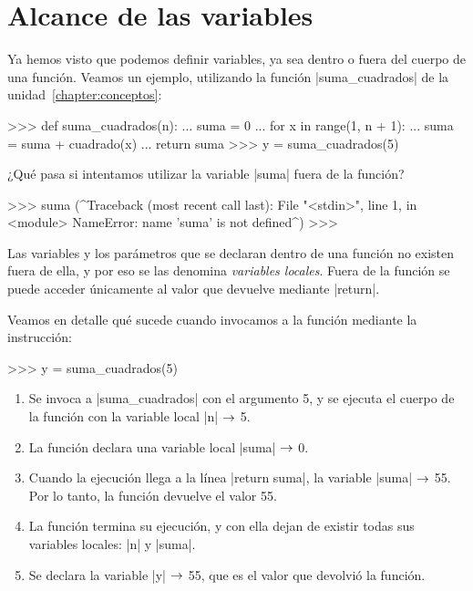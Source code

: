 \section{Alcance de las variables}

Ya hemos visto que podemos definir variables, ya sea dentro o fuera del cuerpo
de una función. Veamos un ejemplo, utilizando la función |suma_cuadrados| de la
unidad~\ref{chapter:conceptos}:

\begin{codigo-python-sn}
>>> def suma_cuadrados(n):
...     suma = 0
...     for x in range(1, n + 1):
...         suma = suma + cuadrado(x)
...     return suma
>>> y = suma_cuadrados(5)
\end{codigo-python-sn}

¿Qué pasa si intentamos utilizar la variable |suma| fuera de la función?

\begin{codigo-python-sn}
>>> suma
(^Traceback (most recent call last):
  File "<stdin>", line 1, in <module>
NameError: name 'suma' is not defined^)
>>>
\end{codigo-python-sn}

\begin{observacion}
Las variables y los parámetros que se declaran dentro de una función no existen
fuera de ella, y por eso se las denomina \emph{variables locales}. Fuera de la
función se puede acceder únicamente al valor que devuelve mediante |return|.
\end{observacion}

Veamos en detalle qué sucede cuando invocamos a la función mediante la
instrucción:

\begin{codigo-python-sn}
>>> y = suma_cuadrados(5)
\end{codigo-python-sn}

\begin{enumerate}
\item Se invoca a |suma_cuadrados| con el argumento 5, y se ejecuta
    el cuerpo de la función con la variable local |n| $\rightarrow$ 5.
\item La función declara una variable local |suma| $\rightarrow$ 0.
\item Cuando la ejecución llega a la línea |return suma|, la variable |suma|
    $\rightarrow$ 55. Por lo tanto, la función devuelve el valor 55.
\item La función termina su ejecución, y con ella dejan de existir todas sus
    variables locales: |n| y |suma|.
\item Se declara la variable |y| $\rightarrow$ 55, que es el valor que devolvió la
    función.
\end{enumerate}

